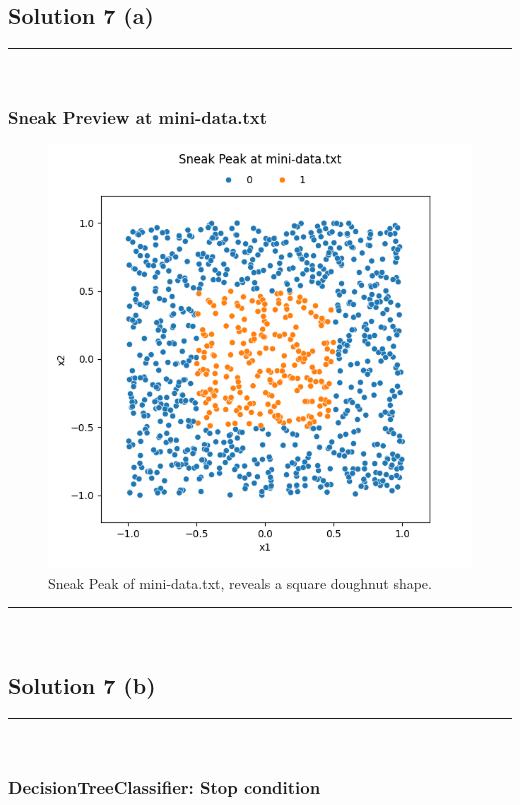 \documentclass{article}
\begin{document}
\newpage


\subsection*{Solution 7 (a)}
\noindent\rule{\textwidth}{0.4pt}\\

\subsubsection*{Sneak Preview at mini-data.txt}

\begin{figure}[H]
  \includegraphics{hw9_q7a.png}
  \caption{Sneak Peak of mini-data.txt, reveals a square doughnut shape.}
\end{figure}

\noindent\rule{\textwidth}{0.4pt}\\

\newpage

\subsection*{Solution 7 (b)}
\noindent\rule{\textwidth}{0.4pt}\\

\subsubsection*{DecisionTreeClassifier: Stop condition}
\end{document}

